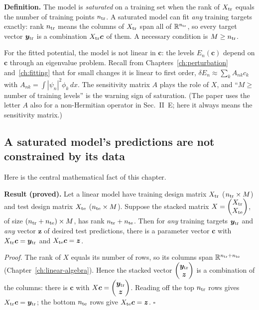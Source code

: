 \textbf{Definition.} The model is \emph{saturated} on a training set when the rank of $X_{\rm tr}$ equals the number of training points $n_{\rm tr}$. A saturated model can fit \emph{any} training targets exactly: rank $n_{\rm tr}$ means the columns of $X_{\rm tr}$ span all of $\mathbb R^{n_{\rm tr}}$, so every target vector $\bm y_{\rm tr}$ is a combination $X_{\rm tr}\bm c$ of them. A necessary condition is $M\ge n_{\rm tr}$.

For the fitted potential, the model is not linear in $\bm c$: the levels $E_n(\bm c)$ depend on $\bm c$ through an eigenvalue problem. Recall from Chapters~\ref{ch:perturbation} and~\ref{ch:fitting} that for small changes it is linear to first order, $\delta E_n\approx\sum_kA_{nk}c_k$ with $A_{nk}=\int|\psi_n|^2\phi_k\,dx$. The sensitivity matrix $A$ plays the role of $X$, and ``$M\ge$ number of training levels'' is the warning sign of saturation. (The paper uses the letter $A$ also for a non-Hermitian operator in Sec.~II~E; here it always means the sensitivity matrix.)

\subsection{A saturated model's predictions are not constrained by its data}

Here is the central mathematical fact of this chapter.

\medskip\noindent\textbf{Result (proved).} Let a linear model have training design matrix $X_{\rm tr}$ ($n_{\rm tr}\times M$) and test design matrix $X_{\rm te}$ ($n_{\rm te}\times M$). Suppose the stacked matrix $X=\begin{pmatrix}X_{\rm tr}\\X_{\rm te}\end{pmatrix}$, of size $(n_{\rm tr}+n_{\rm te})\times M$, has rank $n_{\rm tr}+n_{\rm te}$. Then for \emph{any} training targets $\bm y_{\rm tr}$ and \emph{any} vector $\bm z$ of desired test predictions, there is a parameter vector $\bm c$ with $X_{\rm tr}\bm c=\bm y_{\rm tr}$ and $X_{\rm te}\bm c=\bm z$.

\emph{Proof.} The rank of $X$ equals its number of rows, so its columns span $\mathbb R^{n_{\rm tr}+n_{\rm te}}$ (Chapter~\ref{ch:linear-algebra}). Hence the stacked vector $\begin{pmatrix}\bm y_{\rm tr}\\ \bm z\end{pmatrix}$ is a combination of the columns: there is $\bm c$ with $X\bm c=\begin{pmatrix}\bm y_{\rm tr}\\ \bm z\end{pmatrix}$. Reading off the top $n_{\rm tr}$ rows gives $X_{\rm tr}\bm c=\bm y_{\rm tr}$; the bottom $n_{\rm te}$ rows give $X_{\rm te}\bm c=\bm z$. $\square$

